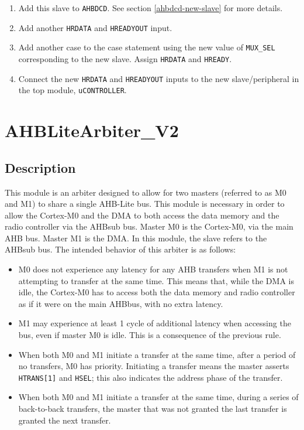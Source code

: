 \begin{enumerate}
	\item Add this slave to \texttt{AHBDCD}. See section \ref{ahbdcd-new-slave} for more details.
	\item Add another \texttt{HRDATA} and \texttt{HREADYOUT} input.
	\item Add another case to the case statement using the new value of \texttt{MUX\_SEL} corresponding to the new slave. Assign \texttt{HRDATA} and \texttt{HREADY}.
	\item Connect the new \texttt{HRDATA} and \texttt{HREADYOUT} inputs to the new slave/peripheral in the top module, \texttt{uCONTROLLER}.
\end{enumerate}

\section{AHBLiteArbiter\_V2}
\subsection{Description}
This module is an arbiter designed to allow for two masters (referred to as M0 and M1) to share a single AHB-Lite bus. This module is necessary in order to allow the Cortex-M0 and the DMA to both access the data memory and the radio controller via the AHBsub bus. Master M0 is the Cortex-M0, via the main AHB bus. Master M1 is the DMA. In this module, the slave refers to the AHBsub bus. The intended behavior of this arbiter is as follows:

\begin{itemize}
	\item M0 does not experience any latency for any AHB transfers when M1 is not attempting to transfer at the same time. This means that, while the DMA is idle, the Cortex-M0 has to access both the data memory and radio controller as if it were on the main AHBbus, with no extra latency.
	\item M1 may experience at least 1 cycle of additional latency when accessing the bus, even if master M0 is idle. This is a consequence of the previous rule. %
	\item When both M0 and M1 initiate a transfer at the same time, after a period of no transfers, M0 has priority. Initiating a transfer means the master asserts \texttt{HTRANS[1]} and \texttt{HSEL}; this also indicates the address phase of the transfer.
	\item When both M0 and M1 initiate a transfer at the same time, during a series of back-to-back transfers, the master that was not granted the last transfer is granted the next transfer.
\end{itemize}

